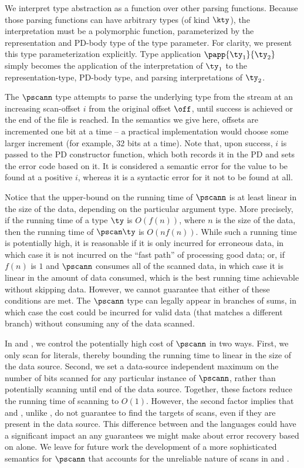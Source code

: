 We interpret type abstraction as a function over other parsing
functions. Because those parsing functions can have
arbitrary \ddca{} types (of kind $\kty$), the interpretation must be a
polymorphic function, parameterized by the representation and PD-body
type of the \ddca{} type parameter.  For clarity, we present
this type parameterization explicitly.  Type application $\papp
{\ty_1}{\ty_2}$ simply becomes the application of the interpretation
of $\ty_1$ to the representation-type, PD-body type, and parsing
interpretations of $\ty_2$.

The $\pscann$ type attempts to parse the underlying type from the
stream at an increasing scan-offset $i$ from the original offset
$\off$, until success is achieved or the end of the file is reached.
In the semantics we give here, offsets are incremented one bit at a
time -- a practical implementation would choose some larger increment
(for example, 32 bits at a time).  Note that, upon success, $i$ is
passed to the PD constructor function, which both records it in the PD
and sets the error code based on it.  It is considered a semantic
error for the value to be found at a positive $i$, whereas it is a
syntactic error for it not to be found at all.

Notice that the upper-bound on the running time of $\pscann$ is at
least linear in the size of the data, depending on the particular
argument type. More precisely, if the running time of a type $\ty$ is
$O(f(n))$, where $n$ is the size of the data, then the running time of
$\pscan \ty$ is $O(n f(n))$. While such a running time is potentially
high, it is reasonable if it is only incurred for erroneous data, in
which case it is not incurred on the ``fast path'' of processing good
data; or, if $f(n)$ is $1$ and $\pscann$ consumes all of the scanned
data, in which case it is linear in the amount of data consumed, which
is the best running time achievable without skipping data.  However,
we cannot guarantee that either of these conditions are met. The
$\pscann$ type can legally appear in branches of sums, in which case
the cost could be incurred for valid data (that matches a different
branch) without consuming any of the data scanned.

In \padsc{} and \padsml{}, we control the potentially high cost of
$\pscann$ in two ways. First, we only scan for literals, thereby
bounding the running time to linear in the size of the data source.
Second, we set a data-source independent maximum on the number of bits
scanned for any particular instance of $\pscann$, rather than
potentially scanning until end of the data source. Together, these
factors reduce the running time of scanning to $O(1)$. However, the
second factor implies that \padsc{} and \padsml{}, unlike \ddc{}, do
not guarantee to find the targets of scans, even if they are present
in the data source. This difference between \ddc{} and the \pads{}
languages could have a significant impact an any guarantees we might
make about error recovery based on \ddc{} alone. We leave for future
work the development of a more sophisticated semantics for $\pscann$
that accounts for the unreliable nature of scans in \padsc{} and
\padsml{}.


